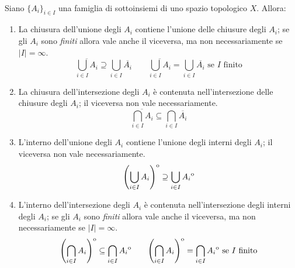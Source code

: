 \begin{proposition}~{}\\\label{chiusurainterno}
Siano $\{A_i\}_{i\in I}$ una famiglia di sottoinsiemi di uno spazio topologico $X$. Allora:
\begin{enumerate}
	\item La chiusura dell'unione degli $A_i$ contiene l'unione delle chiusure degli $A_i$; se gli $A_i$ sono \textit{finiti} allora vale anche il viceversa, ma non necessariamente se $\left|I\right|=\infty$.
	\begin{equation}
		\overline{\bigcup_{i\in I}A_i}\supseteq\bigcup_{i\in I}\overline{A_i}\qquad\overline{\bigcup_{i\in I}A_i}=\bigcup_{i\in I}\overline{A_i}\text{ se }I\text{ finito}
	\end{equation}
	\item La chiusura dell'intersezione degli $A_i$ è contenuta nell'intersezione delle chiusure degli $A_i$; il viceversa non vale necessariamente.
		\begin{equation}
		\overline{\bigcap_{i\in I}A_i}\subseteq\bigcap_{i\in I}\overline{A_i}
	\end{equation}
	\item L'interno dell'unione degli $A_i$ contiene l'unione degli interni degli $A_i$; il viceversa non vale necessariamente.
	\begin{equation}
		{\kern0pt\left(\bigcup_{i\in I}A_i\right)}^{\mathrm{o}}\supseteq\bigcup_{i\in I}{\kern0ptA_i}^{\mathrm{o}}
	\end{equation}
	\item L'interno dell'intersezione degli $A_i$ è contenuta nell'intersezione degli interni degli $A_i$; se gli $A_i$ sono \textit{finiti} allora vale anche il viceversa, ma non necessariamente se $\left|I\right|=\infty$.
	\begin{equation}
		{\kern0pt\left(\bigcap_{i\in I}A_i\right)}^{\mathrm{o}}\subseteq\bigcap_{i\in I}{\kern0ptA_i}^{\mathrm{o}}\qquad{\kern0pt\left(\bigcap_{i\in I}A_i\right)}^{\mathrm{o}}=\bigcap_{i\in I}{\kern0ptA_i}^{\mathrm{o}}\text{ se }I\text{ finito}
	\end{equation}
\end{enumerate}
\end{proposition}
